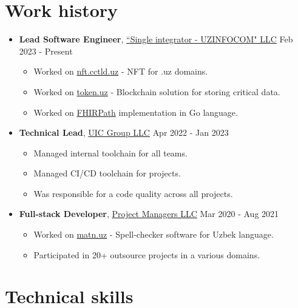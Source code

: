 \documentclass[a4paper,12pt]{article}
\begin{document}
\section*{Work history}

\begin{itemize}[leftmargin=*]
  \item[] \textbf{Lead Software Engineer}, \href{https://www.linkedin.com/company/uzinfocom/}{``Single integrator - UZINFOCOM" LLC} \hfill
    \small{Feb 2023 - Present}
  \begin{itemize} \setlength{\itemsep}{1pt} \setlength{\parskip}{1pt}
    \item Worked on \href{https://nft.cctld.uz}{nft.cctld.uz} - NFT for .uz domains.
    \item Worked on \href{https://token.uz}{token.uz} - Blockchain solution for storing critical data.
    \item Worked on \href{https://www.hl7.org/fhir/fhirpath.html}{FHIRPath} implementation in Go language.
  \end{itemize}


  \item[] \textbf{Technical Lead}, \href{https://www.linkedin.com/company/uic-group/}{UIC Group LLC} \hfill
  \small{Apr 2022 - Jan 2023}
  \begin{itemize} \setlength{\itemsep}{1pt} \setlength{\parskip}{1pt}
    \item Managed internal toolchain for all teams.
    \item Managed CI/CD toolchain for projects.
    \item Was responsible for a code quality across all projects.
  \end{itemize}

  \item[] \textbf{Full-stack Developer}, \href{https://www.linkedin.com/company/pmuzbekistan/}{Project Managers LLC} \hfill
    \small{Mar 2020 - Aug 2021}
  \begin{itemize} \setlength{\itemsep}{1pt} \setlength{\parskip}{1pt}
    \item Worked on \href{https://matn.uz}{matn.uz} - Spell-checker software for Uzbek language.
    \item Participated in 20+ outsource projects in a various domains.
  \end{itemize}
\end{itemize}

\section*{Technical skills}
\end{document}

